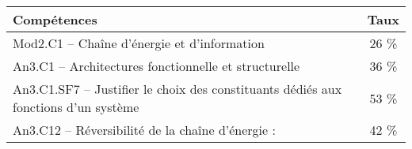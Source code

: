\footnotesize 
\begin{center} 
\begin{tabular}{|p{.7\linewidth}|c|} 
\hline 
Compétences  & Taux \\ \hline \hline 
Mod2.C1 -- Chaîne d’énergie et d'information&26 \% \\ \hline 
An3.C1 -- Architectures fonctionnelle et structurelle &36 \% \\ \hline 
An3.C1.SF7 -- Justifier le choix des constituants dédiés aux fonctions d’un système&53 \% \\ \hline 
An3.C12 -- Réversibilité de la chaîne d’énergie :&42 \% \\ \hline 
\end{tabular} 
\end{center} 
\normalsize 
 
